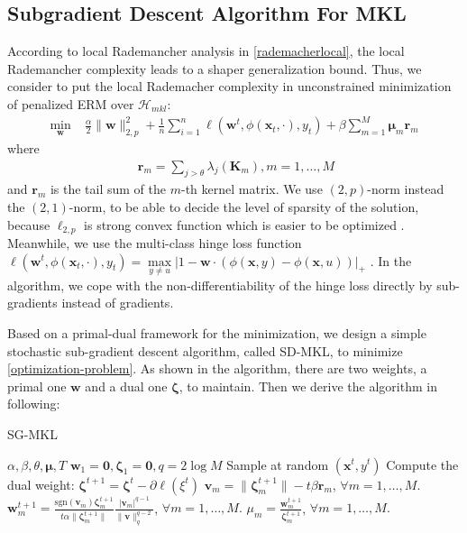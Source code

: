\documentclass{article}
\begin{document}
\subsection{Subgradient Descent Algorithm For MKL}
According to local Rademancher analysis in \ref{rademacherlocal}, the local Rademancher complexity leads to a shaper generalization bound. Thus, we consider to put the local Rademacher complexity in unconstrained minimization of penalized ERM over $\mathcal{H}_{mkl}$:
\begin{align}
    \label{optimization-problem}
    \min_{\mathbf{w}} &\; \frac{\alpha}{2}\|\mathbf{w}\|_{2,p}^2
    + \frac{1}{n}\sum_{i=1}^n\ell(\mathbf{w}^t,\phi(\mathbf{x}_t,\cdot), y_t)
    + \beta\sum_{m=1}^M\mathbf{\mu}_m\mathbf{r}_m
\end{align}
where
\begin{align*}
    \; \mathbf{r}_m=\sum_{j>\theta}\lambda_j(\mathbf{K}_m), m=1,\ldots, M
\end{align*}
and $\mathbf{r}_m$ is the tail sum of the $m$-th kernel matrix. We use $(2,p)$-norm instead the $(2,1)$-norm, to be able to decide the level of sparsity of the solution, because $\ell_{2,p}$ is strong convex function which is easier to be optimized \cite{OrabonaL11}. Meanwhile, we use the multi-class hinge loss function $\ell(\mathbf{w}^t,\phi(\mathbf{x}_t,\cdot), y_t)=\max\limits_{y \not= u}|1-\mathbf{w} \cdot(\phi(\mathbf{x},y)-\phi(\mathbf{x},u))|_+$ \cite{CrammerS02,TsochantaridisHJA04}. In the algorithm, we cope with the non-differentiability of the hinge loss directly by sub-gradients instead of gradients.

Based on a primal-dual framework for the minimization\cite{Shalev-ShwartzK08, Xiao10,OrabonaL11}, we design a simple stochastic sub-gradient descent algorithm, called SD-MKL, to minimize \eqref{optimization-problem}. As shown in the algorithm, there are two weights, a primal one $\mathbf{w}$ and a dual one $\mathbf{\zeta}$, to maintain. Then we derive the algorithm in following:
\begin{algorithm}[tb]
   \caption{SG-MKL}
   \label{algorithm2}
    \begin{algorithmic}
        $\alpha, \beta, \theta, \mathbf{\mu}, T$
        $\mathbf{w}_1=\mathbf{0}, \mathbf{\zeta}_1=\mathbf{0},q=2\log M $
       \STATE Sample at random $(\mathbf{x}^t, y^t)$
       \STATE Compute the dual weight: $\mathbf{\zeta}^{t+1}=\mathbf{\zeta}^t-\partial{\ell(\xi^t)}$
       \STATE $\mathbf{v}_m=\|\mathbf{\zeta}_m^{t+1}\|-t\beta\mathbf{r}_m$, $\forall m=1,\ldots, M.$
       \STATE $\mathbf{w}^{t+1}_m=\frac{\text{sgn}(\mathbf{v}_m) \mathbf{\zeta}_m^{t+1}}{t\alpha\|\mathbf{\zeta}_m^{t+1}\|}
       \frac{|\mathbf{v}_m|^{q-1}}{\|\mathbf{v}\|_q^{q-2}}$, $\forall m=1,\ldots, M.$
       \STATE $\mu_m=\frac{\mathbf{w}^{t+1}_m}{\mathbf{\zeta}^{t+1}_m}$, $\forall m=1,\ldots, M.$
       \ENDFOR
    \end{algorithmic}
\end{algorithm}
\end{document}
